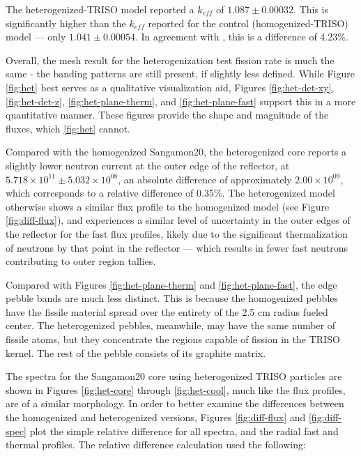 

The heterogenized-TRISO model reported a $k_{eff}$ of $1.087 \pm 0.00032$.  This is significantly higher than the $k_{eff}$ reported for the control (homogenized-TRISO) model --- only $1.041 \pm 0.00054$.  In agreement with \cite{brown_stochastic_2005}, this is a difference of 4.23\%.  

Overall, the mesh result for the heterogenization test fission rate is much the same - the banding patterns are still present, if slightly less defined.  While Figure \ref{fig:het} best serves as a qualitative visualization aid, Figures \ref{fig:het-det-xy}, \ref{fig:het-det-z}, \ref{fig:het-plane-therm}, and \ref{fig:het-plane-fast} support this in a more quantitative manner.  These figures provide the shape and magnitude of the fluxes, which \ref{fig:het} cannot.




Compared with the homogenized Sangamon20, the heterogenized core reports a slightly lower neutron current at the outer edge of the reflector, at $5.718\times10^{11} \pm 5.032\times10^{08}$, an absolute difference of approximately $2.00\times10^{09}$, which corresponds to a relative difference of 0.35\%.  The heterogenized model otherwise shows a similar flux profile to the homogenized model (see Figure \ref{fig:diff-flux}), and experiences a similar level of uncertainty in the outer edges of the reflector for the fast flux profiles, likely due to the significant thermalization of neutrons by that point in the reflector --- which results in fewer fast neutrons contributing to outer region tallies.







Compared with Figures  \ref{fig:het-plane-therm} and \ref{fig:het-plane-fast}, the edge pebble bands are much less distinct.  This is because the homogenized pebbles have the fissile material spread over the entirety of the 2.5 cm radius fueled center.  The heterogenized pebbles, meanwhile, may have the same number of fissile atoms, but they concentrate the regions capable of fission in the TRISO kernel.  The rest of the pebble consists of its graphite matrix.




The spectra for the Sangamon20 core using heterogenized TRISO particles are shown in Figures \ref{fig:het-core} through \ref{fig:het-cool}, much like the flux profiles, are of a similar morphology.  In order to better examine the differences between the homogenized and heterogenized versions, Figures \ref{fig:diff-flux} and \ref{fig:diff-spec} plot the simple relative difference for all spectra, and the radial fast and thermal profiles.  The relative difference calculation used the following:

